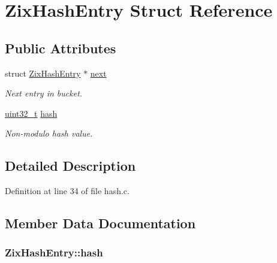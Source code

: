 \hypertarget{struct_zix_hash_entry}{}\section{Zix\+Hash\+Entry Struct Reference}
\label{struct_zix_hash_entry}
\subsection*{Public Attributes}
\begin{DoxyCompactItemize}
\item 
struct \hyperlink{struct_zix_hash_entry}{Zix\+Hash\+Entry} $\ast$ \hyperlink{struct_zix_hash_entry_a59ba09ec7815bf7bde1ea2d49d98a85c}{next}
\begin{DoxyCompactList}\small\item\em Next entry in bucket. \end{DoxyCompactList}\item 
\hyperlink{lib-src_2ffmpeg_2win32_2stdint_8h_a6eb1e68cc391dd753bc8ce896dbb8315}{uint32\+\_\+t} \hyperlink{struct_zix_hash_entry_a0d916562f8f1cc17a6152e32e1dd14e5}{hash}
\begin{DoxyCompactList}\small\item\em Non-\/modulo hash value. \end{DoxyCompactList}\end{DoxyCompactItemize}


\subsection{Detailed Description}


Definition at line 34 of file hash.\+c.



\subsection{Member Data Documentation}
\subsubsection[{\texorpdfstring{hash}{hash}}]{ Zix\+Hash\+Entry\+::hash}\hypertarget{struct_zix_hash_entry_a0d916562f8f1cc17a6152e32e1dd14e5}{}\label{struct_zix_hash_entry_a0d916562f8f1cc17a6152e32e1dd14e5}


